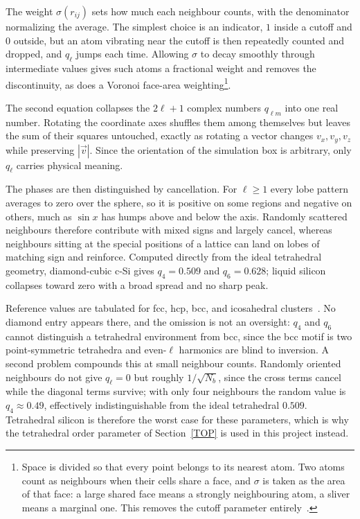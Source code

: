 \documentclass{article}
\begin{document}
The weight $\sigma(r_{ij})$ sets how much each neighbour counts, with the denominator normalizing the average. The simplest choice is an indicator, $1$ inside a cutoff and $0$ outside, but an atom vibrating near the cutoff is then repeatedly counted and dropped, and $q_\ell$ jumps each time. Allowing $\sigma$ to decay smoothly through intermediate values gives such atoms a fractional weight and removes the discontinuity, as does a Voronoi face-area weighting\footnote{Space is divided so that every point belongs to its nearest atom. Two atoms count as neighbours when their cells share a face, and $\sigma$ is taken as the area of that face: a large shared face means a strongly neighbouring atom, a sliver means a marginal one. This removes the cutoff parameter entirely~\cite{mickel2013}.}.

The second equation collapses the $2\ell+1$ complex numbers $q_{\ell m}$ into one real number. Rotating the coordinate axes shuffles them among themselves but leaves the sum of their squares untouched, exactly as rotating a vector changes $v_x, v_y, v_z$ while preserving $|\vec{v}|$. Since the orientation of the simulation box is arbitrary, only $q_\ell$ carries physical meaning.

The phases are then distinguished by cancellation. For $\ell \geq 1$ every lobe pattern averages to zero over the sphere, so it is positive on some regions and negative on others, much as $\sin x$ has humps above and below the axis. Randomly scattered neighbours therefore contribute with mixed signs and largely cancel, whereas neighbours sitting at the special positions of a lattice can land on lobes of matching sign and reinforce. Computed directly from the ideal tetrahedral geometry, diamond-cubic c-Si gives $q_4 = 0.509$ and $q_6 = 0.628$; liquid silicon collapses toward zero with a broad spread and no sharp peak.

Reference values are tabulated for fcc, hcp, bcc, and icosahedral clusters~\cite{steinhardt1983}. No diamond entry appears there, and the omission is not an oversight: $q_4$ and $q_6$ cannot distinguish a tetrahedral environment from bcc, since the bcc motif is two point-symmetric tetrahedra and even-$\ell$ harmonics are blind to inversion. A second problem compounds this at small neighbour counts. Randomly oriented neighbours do not give $q_\ell = 0$ but roughly $1/\sqrt{N_b}$, since the cross terms cancel while the diagonal terms survive; with only four neighbours the random value is $q_4 \approx 0.49$, effectively indistinguishable from the ideal tetrahedral $0.509$. Tetrahedral silicon is therefore the worst case for these parameters, which is why the tetrahedral order parameter of Section~\ref{TOP} is used in this project instead.
\end{document}
